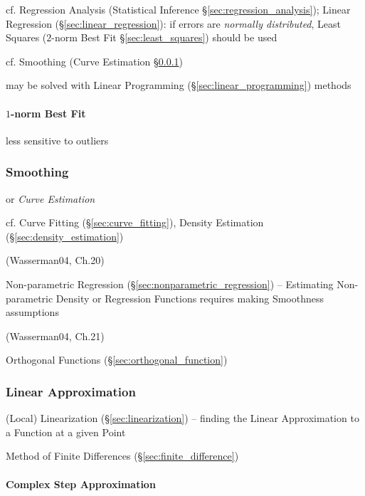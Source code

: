 {\fist cf. Regression Analysis (Statistical Inference
\S\ref{sec:regression_analysis}); Linear Regression
(\S\ref{sec:linear_regression}): if errors are \emph{normally distributed},
Least Squares ($2$-norm Best Fit \S\ref{sec:least_squares}) should be used

cf. Smoothing (Curve Estimation \S\ref{sec:smoothing})

may be solved with Linear Programming (\S\ref{sec:linear_programming}) methods



\paragraph{$1$-norm Best Fit}\label{sec:1norm_best_fit}\hfill

less sensitive to outliers



\subsubsection{Smoothing}\label{sec:smoothing}

or \emph{Curve Estimation}

cf. Curve Fitting (\S\ref{sec:curve_fitting}), Density Estimation
(\S\ref{sec:density_estimation})

(Wasserman04, Ch.20)

Non-parametric Regression (\S\ref{sec:nonparametric_regression}) -- Estimating
Non-parametric Density or Regression Functions requires making Smoothness
assumptions

(Wasserman04, Ch.21)

Orthogonal Functions (\S\ref{sec:orthogonal_function})



\subsubsection{Linear Approximation}\label{sec:linear_approximation}

\fist (Local) Linearization (\S\ref{sec:linearization}) -- finding the Linear
Approximation to a Function at a given Point

\fist Method of Finite Differences (\S\ref{sec:finite_difference})



\paragraph{Complex Step Approximation}\label{sec:complex_step}\hfill

}
